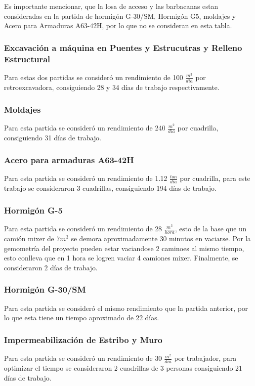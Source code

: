 \documentclass{article} %
\begin{document}
Es importante mencionar, que la losa de acceso y las barbacanas estan consideradas en la partida de hormigón G-30/SM, Hormigón G5, moldajes y Acero para Armaduras A63-42H, por lo que no se consideran en esta tabla.

\subsubsection{Excavación a máquina en Puentes y Estrucutras y Relleno Estructural}
Para estas dos partidas se consideró un rendimiento de 100 $\frac{m^3}{dia}$ por retroexcavadora, consiguiendo 28 y 34 días de trabajo respectivamente.

\subsubsection{Moldajes}
Para esta partida se consideró un rendimiento de 240 $\frac{m^2}{dia}$ por cuadrilla, consiguiendo 31 días de trabajo.

\subsubsection{Acero para armaduras A63-42H}
Para esta partida se consideró un rendimiento de 1.12 $\frac{ton}{dia}$ por cuadrilla, para este trabajo se consideraron 3 cuadrillas, consiguiendo 194 días de trabajo.

\subsubsection{Hormigón G-5}
Para esta partida se consideró un rendimiento de 28 $\frac{m^3}{hora}$, esto de la base que un camión mixer de $7m^3$ se demora aproximadamente 30 minutos en vaciarse. Por la gemometría del proyecto pueden estar vaciandose 2 caminoes al mismo tiempo, esto conlleva que en 1 hora se logren vaciar 4 camiones mixer. Finalmente, se consideraron 2 días de trabajo.

\subsubsection{Hormigón G-30/SM}
Para esta partida se consideró el mismo rendimiento que la partida anterior, por lo que esta tiene un tiempo aproximado de 22 días.

\subsubsection{Impermeabilización de Estribo y Muro}
Para esta partida se consideró un rendimiento de 30 $\frac{m^2}{dia}$ por trabajador, para optimizar el tiempo se consideraron 2 cuadrillas de 3 personas consiguiendo 21 días de trabajo.
\end{document}
